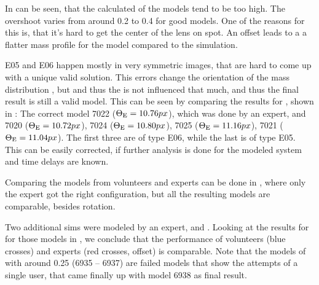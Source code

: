 In  can be seen, that the calculated \ERf of the models tend to be too high.
The overshoot varies from around 0.2 to 0.4 for good models.
One of the reasons for this is, that it's hard to get the center of the lens on spot.
An offset leads to a a flatter mass profile for the model compared to the simulation.





E05 and E06 happen mostly in very symmetric images, that are hard to come up with a unique valid solution.
This errors change the orientation of the mass distribution \kap[x,y],
but \kenc and thus the \ERf is not influenced that much, and thus the final result is still a valid model.
This can be seen by comparing the results for , shown in : 
The correct model 7022 ($\Theta_\text{E}=10.76px$), which was done by an expert, and
7020 ($\Theta_\text{E}=10.72px$),
7024 ($\Theta_\text{E}=10.80px$),
7025 ($\Theta_\text{E}=11.16px$),
7021 ($\Theta_\text{E}=11.04px$).
The first three are of type E06, while the last is of type E05.
This can be easily corrected, if further analysis is done for the modeled system and time delays are known.


Comparing the models from volunteers and experts can be done in , where only the
expert got the right configuration, but all the resulting models are comparable, besides rotation.

Two additional sims were modeled by an expert,  and .
Looking at the results for \ERg for those models in , we conclude that the performance of volunteers (blue crosses) and experts (red crosses, offset) is comparable.
Note that the models of  with \ERg[, rel] around 0.25 (6935 -- 6937) are failed models that show the attempts of a single user, that came finally up with model 6938 as final result.

\clearpage
